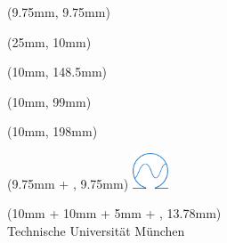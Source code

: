 \begin{titlepage}
    \if@titlepage@sansserif
      \sffamily
    \fi



    \if@titlepage@showlayout
      \begin{textblock*}{10.5mm}(9.75mm, 9.75mm)
          \hspace{1mm} \vspace{10.5mm}
      \end{textblock*}

      \begin{textblock*}{180mm}(25mm, 10mm)
          \hspace{1mm} \vspace{10mm}
      \end{textblock*}

      \begin{textblock*}{190mm}(10mm, 148.5mm) %
          \noindent\makebox[\hsize]{\rule{\textwidth}{1pt}}
      \end{textblock*}

      \begin{textblock*}{190mm}(10mm, 99mm) %
          \noindent\makebox[\hsize]{\rule{\textwidth}{1pt}}
      \end{textblock*}

      \begin{textblock*}{190mm}(10mm, 198mm) %
          \noindent\makebox[\hsize]{\rule{\textwidth}{1pt}}
      \end{textblock*}
    \fi



%    
	\begin{textblock*}{10.5mm}(9.75mm + \@titlepagebindingcor, 9.75mm)
		\noindent \includegraphics[height = 10.5mm]{frontmatter/images/FAK_EI_RGB_s.eps}
	\end{textblock*}

    \begin{textblock*}{120mm}(10mm + 10mm + 5mm + \@titlepagebindingcor, 13.78mm)
        \footnotesize
        \selectfont
        \noindent \textcolor{TUMBlue}{
          {\facultyger{}}
        }\\
        \selectfont
        \textcolor{TUMBlue}{
          Technische Universit\"at M\"unchen
        }
    \end{textblock*}


\end{titlepage}
